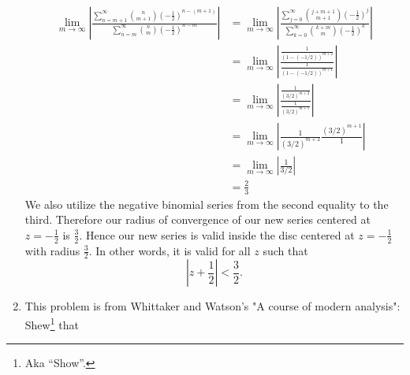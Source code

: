 \documentclass[10pt]{amsart}
\theoremstyle{nonumberplain}
\begin{document}
\begin{enumerate}[label={\bf {\arabic*}:}]
\begin{align*}
\lim_{m \rightarrow \infty} \left| \frac {\sum_{n=m+1}^\infty {n \choose m+1} \left(-\frac 1 2\right)^{n - (m + 1)}}{\sum_{n=m}^\infty {n \choose m} \left(-\frac 1 2\right)^{n - m}} \right|
	&= \lim_{m \rightarrow \infty} \left| \frac {\sum_{j=0}^\infty {j + m + 1 \choose m+1} \left(-\frac 1 2\right)^j}{\sum_{k=0}^\infty {k + m \choose m} \left(-\frac 1 2\right)^k} \right| \\
	&= \lim_{m \rightarrow \infty} \left| \frac {\frac 1 {(1 - (-1/2))^{m+2}}}{\frac 1 {(1 - (-1/2))^{m+1}}} \right| \\
	&= \lim_{m \rightarrow \infty} \left| \frac {\frac 1 {(3/2)^{m+2}}}{\frac 1 {(3/2)^{m+1}}} \right| \\
	&= \lim_{m \rightarrow \infty} \left|  \frac 1 {(3/2)^{m+2}} \frac {(3/2)^{m+1}} 1  \right| \\
	&= \lim_{m \rightarrow \infty} \left|  \frac 1 {3/2}  \right| \\
	&= \frac 2 3
\end{align*}
We also utilize the negative binomial series from the second equality to the third.
Therefore our radius of convergence of our new series centered at $z = -\frac 1 2$ is $\frac 3 2$.
Hence our new series is valid inside the disc centered at $z=-\frac 1 2$ with radius $\frac 3 2$.
In other words, it is valid for all $z$ such that
$$
\left| z + \frac 1 2\right| < \frac 3 2.
$$
\newpage

\item This problem is from Whittaker and Watson's "A course of modern
  analysis": Shew\footnote{Aka ``Show''.} that


\end{enumerate}
\end{document}
